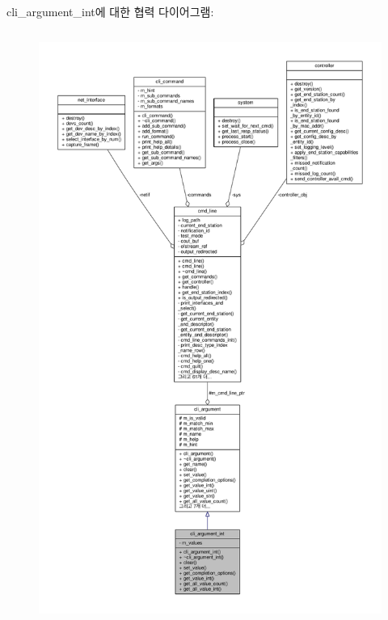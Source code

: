 cli\+\_\+argument\+\_\+int에 대한 협력 다이어그램\+:
\nopagebreak
\begin{figure}[H]
\begin{center}
\leavevmode
\includegraphics[height=550pt]{classcli__argument__int__coll__graph}
\end{center}
\end{figure}
